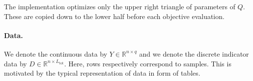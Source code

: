\documentclass{article}
\def\tot{\text{tot}}
\newcommand{\IR}{{\mathbb{R}}}\newcommand{\IN}{{\mathbb{N}}}
\DeclareMathOperator{\diag}{diag}
\begin{document}
The implementation optimizes only the upper right triangle of parameters of $Q$.
These are copied down to the lower half before each objective evaluation.



\paragraph{Data.}
We denote the continuous data by $Y\in\IR^{n\times q}$ and we denote the discrete indicator data by $D\in\IR^{n\times L_{\tot}}$.
Here, rows respectively correspond to samples. This is motivated by the typical representation of data in form of tables.
\end{document}
